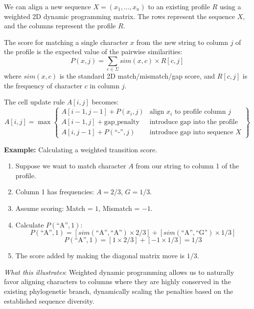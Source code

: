 We can align a new sequence $X = (x_1, \dots, x_n)$ to an existing profile $R$ using a weighted 2D dynamic programming matrix. The rows represent the sequence $X$, and the columns represent the profile $R$.

The score for matching a single character $x$ from the new string to column $j$ of the profile is the expected value of the pairwise similarities:
\begin{equation}
P(x, j) = \sum_{c \in \Sigma} sim(x, c) \times R[c, j]
\end{equation}
where $sim(x,c)$ is the standard 2D match/mismatch/gap score, and $R[c,j]$ is the frequency of character $c$ in column $j$.

The cell update rule $A[i,j]$ becomes:
\begin{equation}
A[i,j] = \max \left\{ 
\begin{array}{ll} 
A[i-1, j-1] + P(x_i, j) & \text{align } x_i \text{ to profile column } j \\ 
A[i-1, j] + \text{gap\_penalty} & \text{introduce gap into the profile} \\ 
A[i, j-1] + P(\text{``-''}, j) & \text{introduce gap into sequence } X 
\end{array} 
\right\}
\end{equation}

\textbf{Example:} Calculating a weighted transition score.
\begin{enumerate}
    \item Suppose we want to match character $A$ from our string to column 1 of the profile.
    \item Column 1 has frequencies: $A = 2/3$, $G = 1/3$.
    \item Assume scoring: Match = $1$, Mismatch = $-1$.
    \item Calculate $P(\text{``A''}, 1)$: 
    \[
    P(\text{``A''}, 1) = [sim(\text{``A''}, \text{``A''}) \times 2/3] + [sim(\text{``A''}, \text{``G''}) \times 1/3]
    \]
    \[
    P(\text{``A''}, 1) = [1 \times 2/3] + [-1 \times 1/3] = 1/3
    \]
    \item The score added by making the diagonal matrix move is $1/3$.
\end{enumerate}
\textit{What this illustrates}: Weighted dynamic programming allows us to naturally favor aligning characters to columns where they are highly conserved in the existing phylogenetic branch, dynamically scaling the penalties based on the established sequence diversity.

